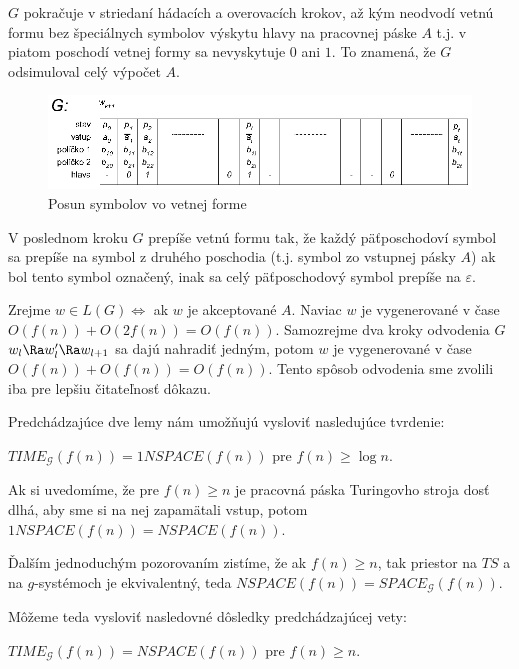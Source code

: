 \begin{dokaz}
$G$ pokračuje v striedaní hádacích a overovacích krokov, až kým
neodvodí vetnú formu bez špeciálnych symbolov výskytu hlavy na
pracovnej páske $A$ t.j. v piatom poschodí vetnej formy sa
nevyskytuje $0$ ani $1$. To znamená, že $G$ odsimuloval celý
výpočet $A$.

\begin{figure}[!ht]
  \centering
  \includegraphics{./OBRAZKY/GSYSTEMS/TIME_G2}
  \caption{Posun symbolov vo vetnej forme} \label{gs_obr_time_g2}
\end{figure}

V poslednom kroku $G$ prepíše vetnú formu tak, že každý
päťposchodoví symbol sa prepíše na symbol z druhého poschodia
(t.j. symbol zo vstupnej pásky $A$) ak bol tento symbol označený,
inak sa celý päťposchodový symbol prepíše na $\varepsilon$.

Zrejme $w\in L(G)\Longleftrightarrow$ ak $w$ je akceptované $A$.
Naviac $w$ je vygenerované v čase\newline
$O(f(n))+O(2f(n))=O(f(n))$. Samozrejme dva kroky odvodenia $G$
$w_l\Ra w_l'\Ra w_{l+1}$ sa dajú nahradiť jedným, potom $w$ je
vygenerované v čase $O(f(n))+O(f(n))=O(f(n))$. Tento spôsob
odvodenia sme zvolili iba pre lepšiu čitateľnosť dôkazu.
\end{dokaz}

\medskip
Predchádzajúce dve lemy nám umožňujú vysloviť nasledujúce tvrdenie:

\begin{veta}
$TIME_{\mathcal{G}}(f(n))=1NSPACE(f(n))$ pre $f(n)\geq\log n$.
\end{veta}

Ak si uvedomíme, že pre $f(n)\geq n$ je pracovná páska Turingovho
stroja dosť dlhá, aby sme si na nej zapamätali vstup, potom
$1NSPACE(f(n))=NSPACE(f(n))$.

Ďalším jednoduchým pozorovaním zistíme, že ak $f(n)\geq n$, tak
priestor na $TS$ a na $g$-systémoch je ekvivalentný, teda
$NSPACE(f(n))=SPACE_{\mathcal{G}}(f(n))$.

Môžeme teda vysloviť nasledovné dôsledky predchádzajúcej vety:

\begin{dosledok}
$TIME_{\mathcal{G}}(f(n))=NSPACE(f(n))$ pre $f(n)\geq n$.
\end{dosledok}

